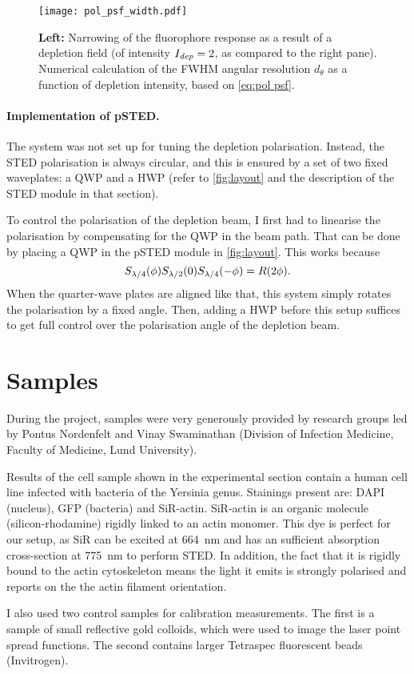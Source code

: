 \begin{figure}
	\centering
	\texttt{[image: pol\_psf\_width.pdf]}
	\caption{\textbf{Left:} Narrowing of the fluorophore response as a result of a depletion field (of intensity $ I_{\mathit{dep}}=2 $, as compared to the right pane).  Numerical calculation of the FWHM angular resolution $ d_\theta $ as a function of depletion intensity, based on \autoref{eq:pol psf}.}
	\label{fig:pol psf width}
\end{figure}

\paragraph{Implementation of pSTED.} The system was not set up for tuning the depletion polarisation. Instead, the STED polarisation is always circular, and this is ensured by a set of two fixed waveplates: a QWP and a HWP (refer to \autoref{fig:layout} and the description of the STED module in that section). 

To control the polarisation of the depletion beam, I first had to linearise the polarisation by compensating for the QWP in the beam path. That can be done by placing a QWP in the pSTED module in \autoref{fig:layout}. This works because 
\begin{equation}
	S_{\lambda/4}(\phi)S_{\lambda/2}(0)S_{\lambda/4}(-\phi) = R(2\phi).
\end{equation}
When the quarter-wave plates are aligned like that, this system simply rotates the polarisation by a fixed angle. Then, adding a HWP before this setup suffices to get full control over the polarisation angle of the depletion beam.

\section{Samples}
\label{sec:samples}

During the project, samples were very generously provided by research groups led by Pontus Nordenfelt and Vinay Swaminathan (Division of Infection Medicine, Faculty of Medicine, Lund University).

Results of the cell sample shown in the experimental section contain a human cell line infected with bacteria of the Yersinia genus. Stainings present are: DAPI (nucleus), GFP (bacteria) and SiR-actin. SiR-actin is an organic molecule (silicon-rhodamine) rigidly linked to an actin monomer. This dye is perfect for our setup, as SiR can be excited at 664~nm and has an sufficient absorption cross-section at 775~nm to perform STED. In addition, the fact that it is rigidly bound to the actin cytoskeleton means the light it emits is strongly polarised and reports on the the actin filament orientation.

I also used two control samples for calibration measurements. The first is a sample of small  reflective gold colloids, which were used to image the laser point spread functions. The second contains larger Tetraspec fluorescent beads (Invitrogen).